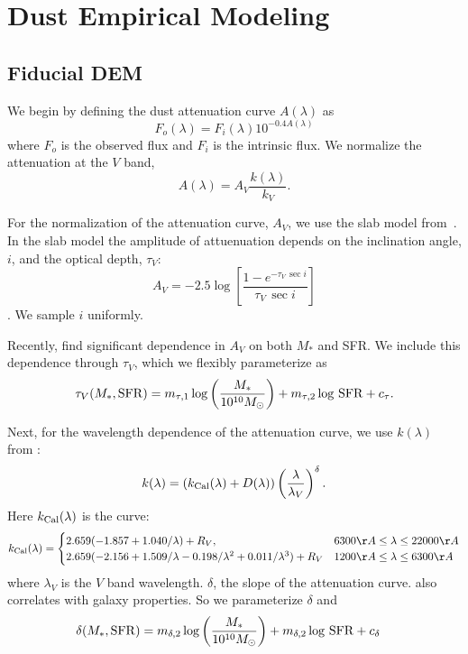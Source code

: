 \section{Dust Empirical Modeling} \label{sec:methods}
\subsection{Fiducial DEM} 

We begin by defining the dust attenuation curve $A(\lambda)$ as 
\begin{equation} 
    F_o (\lambda) = F_i (\lambda) 10^{-0.4 A(\lambda)}
\end{equation}
where $F_o$ is the observed flux and $F_i$ is the intrinsic flux. We normalize the attenuation at the $V$ band, 
\begin{equation} 
    A(\lambda) = A_V \frac{k(\lambda)}{k_V}. 
\end{equation}


For the normalization of the attenuation curve, $A_V$, we use the slab model
from~\cite{somerville1999, somerville2012}. In the slab model the amplitude of
attuenuation depends on the inclination angle, $i$, and the optical depth,
$\tau_V$: 
\begin{equation} 
    A_V = -2.5 \log \left[ \frac{1 - e^{-\tau_V\,\sec i}}{\tau_V\,\sec i} \right]
\end{equation}
. We sample $i$ uniformly.

Recently, \cite{salim2020} find significant dependence in $A_V$ on both $M_*$
and SFR. We include this dependence through $\tau_V$, which we flexibly
parameterize as 
\begin{equation}
    \tau_V(M_*, {\rm SFR}) = m_{\tau,1} \log \left(\frac{M_*}{10^{10} M_\odot}\right) +
    m_{\tau,2} \log\,{\rm SFR} + c_\tau.
\end{equation}

Next, for the wavelength dependence of the attenuation curve, we use $k(\lambda)$ from 
\cite{noll2009}: 
\begin{equation}
    k(\lambda) = \left(k_{\rm Cal}(\lambda) + D(\lambda)\right) \left(
    \frac{\lambda}{\lambda_V} \right)^\delta.
\end{equation}
Here $k_{\rm Cal}(\lambda)$ is the \cite{calzetti2001} curve: 
\[
    k_{\rm Cal}(\lambda) = 
    \begin{cases} 
        2.659 (-1.857 + 1.040/\lambda) + R_V, & 6300 \AA \le \lambda \le
        22000 \AA \\ 
        2.659 (-2.156 + 1.509/\lambda - 0.198/\lambda^2 + 0.011/\lambda^3) +
        R_V & 1200 \AA \le \lambda \le 6300 \AA
    \end{cases}
\]
where $\lambda_V$ is the $V$ band wavelength. $\delta$, the slope of the attenuation curve.
also correlates with galaxy
properties.
So we parameterize $\delta$ and 
\begin{align}
    \delta(M_*, {\rm SFR}) &= m_{\delta,2} \log \left(\frac{M_*}{10^{10}
    M_\odot}\right) + m_{\delta,2} \log\,{\rm SFR} + c_\delta 
\end{align}

